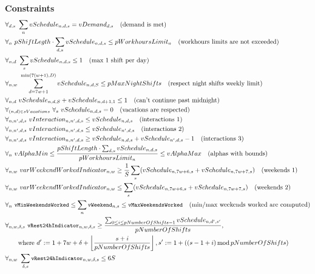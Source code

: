 \documentclass{article}
\newcommand{\varWeekendWorkedIndicator}[2]{\texttt{\small vWeekend}_{#1, #2}}
\newcommand{\varMinWeekendsWorked}{\texttt{\small vMinWeekendsWorked}}
\newcommand{\varMaxWeekendsWorked}{\texttt{\small vMaxWeekendsWorked}}
\newcommand{\varDayLengthBreakIndicator}[4]{\texttt{\small vRest24hIndicator}_{#1, #2, #3, #4}}
\begin{document}
\textbf{Constraints}
\begin{align*}
&\forall_{d,s}\ \sum_n vSchedule_{n,d,s} = vDemand_{d, s}\quad \text{(demand is met)} \\
&\forall_{n}\ pShiftLegth\cdot\sum_{d, s} vSchedule_{n,d,s} \leq pWorkhoursLimit_n \quad \text{(workhours limits are not exceeded)} \\
&\forall_{n,d}\ \sum_s vSchedule_{n,d,s} \leq 1\quad \text{(max 1 shift per day)} \\
&\forall_{n,w}\ \sum_{d=7w+1}^{\min(7(w+1), D)} vSchedule_{n,d,S} \leq pMaxNightShifts \quad \text{(respect night shifts weekly limit)} \\
&\forall_{n,d}\ vSchedule_{n,d,S}+vSchedule_{n,d+1,1} \leq 1\quad \text{(can't continue past midnight)} \\
&\forall_{(n,d)\in sVacations}\ \forall_s\ vSchedule_{n,d,s} = 0\quad \text{(vacations are respected)} \\
&\forall_{n,n',d,s}\ vInteraction_{n,n',d,s} \leq vSchedule_{n,d,s}\quad \text{(interactions 1)} \\
&\forall_{n,n',d,s}\ vInteraction_{n,n',d,s} \leq vSchedule_{n',d,s}\quad \text{(interactions 2)} \\
&\forall_{n,n',d,s}\ vInteraction_{n,n',d,s} \geq vSchedule_{n,d,s}+vSchedule_{n',d,s}-1\quad \text{(interactions 3)} \\
&\forall_{n}\ vAlphaMin \leq \frac{pShiftLength\cdot\sum_{d,s}vSchedule_{n,d,s}}{pWorkhoursLimit_n} \leq vAlphaMax\quad \text{(alphas with bounds)} \\
&\forall_{n, w}\ varWeekendWorkedIndicator_{n, w} \geq \frac{1}{S}\sum_s (vSchedule_{n, 7w+6, s} + vSchedule_{n, 7w+7, s}) \quad \text{(weekends 1)} \\
&\forall_{n, w}\ varWeekendWorkedIndicator_{n, w} \leq \sum_s (vSchedule_{n, 7w+6, s} + vSchedule_{n, 7w+7, s}) \quad \text{(weekends 2)} \\
&\forall_{n}\ \varMinWeekendsWorked \le \sum_n \varWeekendWorkedIndicator{n}{s} \le \varMaxWeekendsWorked \quad \text{(min/max weekends worked are computed)} \\
&\forall_{n,w,\delta,s}\ \varDayLengthBreakIndicator{n}{w}{\delta}{s} \ge \frac{\sum_{0 \le i \le pNumberOfShifts - 1} vSchedule_{n, d', s'}}{pNumberOfShifts}, \\
    &\qquad\text{where } d' := 1+7w+\delta+\left\lfloor\frac{s+i}{pNumberOfShifts}\right\rfloor, s' := 1 + ((s - 1 + i) \operatorname{mod} pNumberOfShifts) \\
&\forall_{n, w}\ \sum_{\delta, s} \varDayLengthBreakIndicator{n}{w}{\delta}{s} \le 6S
\end{align*}
\end{document}
